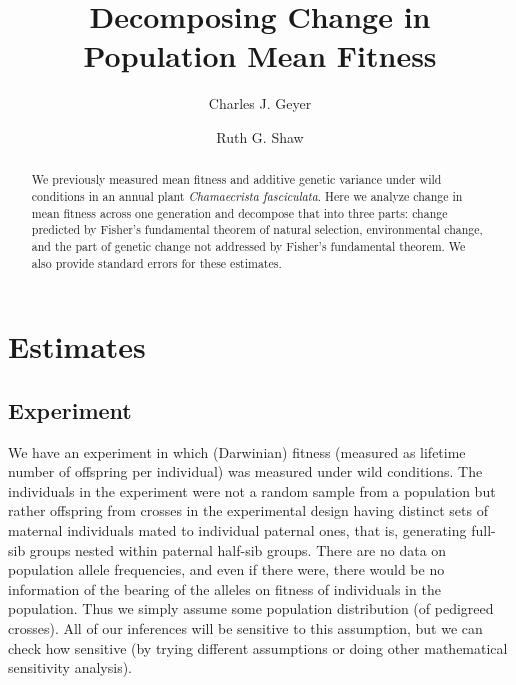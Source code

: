 \documentclass[11pt]{article}
\begin{document}
\title{Decomposing Change in Population Mean Fitness}

\author{Charles J. Geyer \and Ruth G. Shaw}

\maketitle

\begin{abstract}
We previously measured mean fitness and additive genetic variance
under wild conditions in an annual plant \emph{Chamaecrista fasciculata}.
Here we analyze change in mean fitness across one generation and
decompose that into three parts: change predicted by Fisher's
fundamental theorem of natural selection, environmental change,
and the part of genetic change not addressed by Fisher's fundamental
theorem.  We also provide standard errors for these estimates.
\end{abstract}

\section{Estimates}

\subsection{Experiment}

We have an experiment \citep{kulbaba,zenodo} in which (Darwinian) fitness
(measured as lifetime
number of offspring per individual) was measured under wild conditions.
The individuals in the experiment were not a random sample from
a population but rather offspring from crosses in the experimental design having distinct sets of maternal
individuals mated to individual paternal ones, that is,
generating full-sib groups nested within paternal half-sib
groups.  There are no data on
population allele frequencies, and even if there were, there would be
no information of the bearing of the alleles on fitness of individuals in the population. 
Thus we simply assume some population distribution (of
pedigreed crosses).  All of our inferences will be sensitive to this
assumption, but we can check how sensitive (by trying different assumptions
or doing other mathematical sensitivity analysis).
\end{document}
